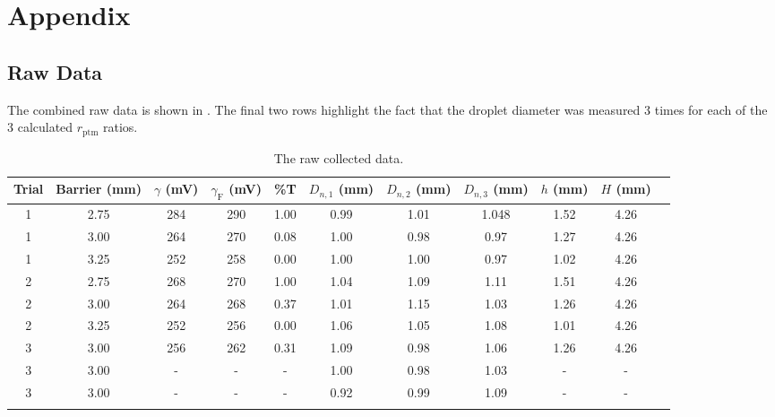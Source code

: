 \chapter*{Appendix}
\setcounter{chapter}{5}
	\setcounter{section}{0}
\label{app:raw}
\section*{Raw Data}
The combined raw data is shown in . The final two rows highlight the fact that the droplet diameter was measured 3 times for each of the 3 calculated $r_\mathrm{ptm}$ ratios.
\begin{sidewaystable}[ht]
\caption{The raw collected data.}
\centering
\begin{tabular}{ccccccccccc}
  \hline
 Trial & Barrier (mm) & $\gamma$ (mV) & $\gamma_\mathrm{F}$ (mV) & \%T & $D_{n,1}$ (mm) &$D_{n,2}$ (mm) & $D_{n,3}$ (mm)& $h$ (mm) & $H$ (mm)\\ 
  \hline
 1 & 2.75 & 284 & 290 & 1.00 & 0.99 &1.01&1.048& 1.52 & 4.26 \\ 
   1 & 3.00 & 264 & 270 & 0.08 & 1.00 &0.98 &0.97 & 1.27  & 4.26 \\ 
   1 & 3.25 & 252 & 258 & 0.00 & 1.00 & 1.00 &0.97 & 1.02  & 4.26 \\ 
   2 & 2.75 & 268 & 270 & 1.00 & 1.04 &1.09 &1.11 & 1.51 & 4.26 \\ 
   2 & 3.00 & 264 & 268 & 0.37 & 1.01 &1.15 &1.03 & 1.26  & 4.26 \\ 
   2 & 3.25 & 252 & 256 & 0.00 & 1.06 &1.05 &1.08 & 1.01  & 4.26 \\ 
   3 & 3.00 & 256 & 262 & 0.31 & 1.09& 0.98& 1.06 & 1.26  & 4.26 \\
   3&3.00&-&-&-& 1.00 & 0.98 & 1.03 & -&-\\
   3&3.00&-&-&-& 0.92& 0.99& 1.09 & -&-
   \\ 
   \hline
  \label{raw}
\end{tabular}
\end{sidewaystable}


